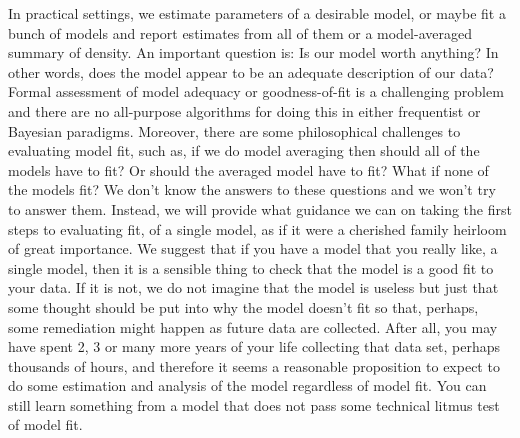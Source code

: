 In practical settings, we estimate parameters of a desirable model, or
maybe fit a bunch of models and report estimates from all of them or a
model-averaged summary of density.  An important question is: Is our
model worth anything?  In other words, does the model appear to be an
adequate description of our data?
Formal assessment of model adequacy or goodness-of-fit is a
challenging problem and there are no all-purpose algorithms for doing
this in either frequentist or Bayesian paradigms. Moreover, there are
some philosophical challenges to evaluating model fit, such as, if we
do model averaging then should all of the models have to fit? Or
should the averaged model have to fit? What if none of the models fit?
We don't know the answers to these questions and we won't try to
answer them. Instead, we will provide what guidance we can on taking
the first steps to evaluating fit, of a single model, as if it were a
cherished family heirloom of great importance.  We suggest that if you
have a model that you really like, a single model, then it is a
sensible thing to check that the model is a good fit to your data. If
it is not, we do not imagine that the model is useless but just that
some thought should be put into why the model doesn't fit so that,
perhaps, some remediation might happen as future data are
collected. After all, you may have spent 2, 3 or many more years of
your life collecting that data set, perhaps thousands of hours, and
therefore it seems a reasonable proposition to expect to do some
estimation and analysis of the model regardless of model fit. You can
still learn something from a model that does not pass some technical
litmus test of model fit.

